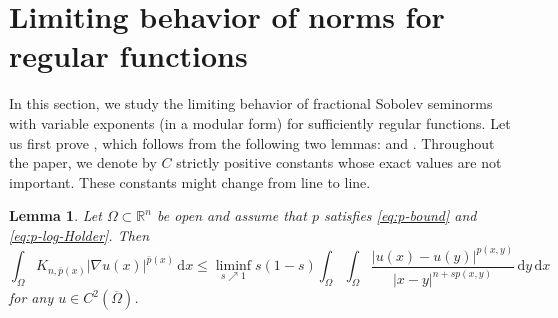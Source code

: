 \documentclass[11pt]{amsart}
\theoremstyle{plain}
\newtheorem{lemma}[theorem]{Lemma}
\theoremstyle{definition}
\numberwithin{equation}{section}
\begin{document}

\section{Limiting behavior of norms for regular functions} \label{sec:limit}


In this section, we study the limiting behavior of fractional Sobolev seminorms  with variable exponents (in a modular form) for sufficiently regular functions. Let us first prove , which follows from the following two lemmas:  and . Throughout the paper, we denote by $C$ strictly positive constants whose exact values are not important. These constants might change from line to line.

\begin{lemma} \label{lem:liminf}
Let $\Omega \subset \mathbb{R}^{n}$ be open and assume that $p$ satisfies \eqref{eq:p-bound} and \eqref{eq:p-log-Holder}. Then
\begin{equation} \label{eq:liminf}
\int_{\Omega} K_{n, \bar{p}(x)} |\nabla u(x)|^{\bar{p}(x)} \,\mathrm{d}x \leq \liminf_{s \nearrow 1} s(1-s) \int_{\Omega} \int_{\Omega} \frac{|u(x)-u(y)|^{p(x, y)}}{|x-y|^{n+sp(x, y)}} \,\mathrm{d}y \,\mathrm{d}x
\end{equation}
for any $u \in C^{2}(\overline{\Omega})$.
\end{lemma}
\end{document}
